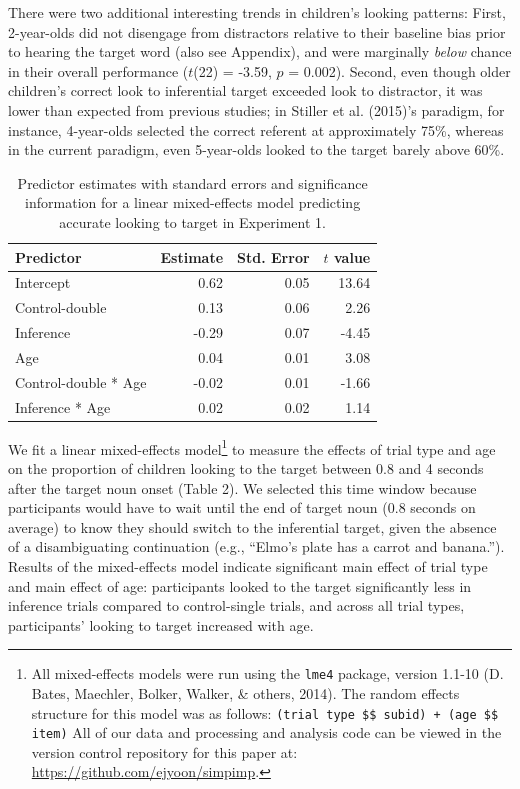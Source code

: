 \documentclass[a4paper,man,apacite,floatsintext]{apa6}
\begin{document}
There were two additional interesting trends in children's looking
patterns: First, 2-year-olds did not disengage from distractors relative
to their baseline bias prior to hearing the target word (also see
Appendix), and were marginally \emph{below} chance in their overall
performance (\(t\)(22) = -3.59, \(p\) = 0.002). Second, even though
older children's correct look to inferential target exceeded look to
distractor, it was lower than expected from previous studies; in Stiller
et al. (2015)'s paradigm, for instance, 4-year-olds selected the correct
referent at approximately 75\%, whereas in the current paradigm, even
5-year-olds looked to the target barely above 60\%.

\begin{table}[tb]
\centering
\begin{tabular}{lrrr}
 Predictor & Estimate & Std. Error & $t$ value \\ 
  \hline
Intercept & 0.62 & 0.05 & 13.64 \\ 
  Control-double & 0.13 & 0.06 & 2.26 \\ 
  Inference & -0.29 & 0.07 & -4.45 \\ 
  Age & 0.04 & 0.01 & 3.08 \\ 
  Control-double * Age & -0.02 & 0.01 & -1.66 \\ 
  Inference * Age & 0.02 & 0.02 & 1.14 \\ 
   \hline
\end{tabular}
\caption{Predictor estimates with standard errors and significance information for a linear mixed-effects model predicting accurate looking to target in Experiment 1.} 
\label{tab:exp1_tab}
\end{table}

We fit a linear mixed-effects model\footnote{All mixed-effects models
  were run using the \texttt{lme4} package, version 1.1-10 (D. Bates,
  Maechler, Bolker, Walker, \& others, 2014). The random effects
  structure for this model was as follows:
  \texttt{(trial type \$\textbar{}\$ subid) + (age \$\textbar{}\$ item)}
  All of our data and processing and analysis code can be viewed in the
  version control repository for this paper at:
  \url{https://github.com/ejyoon/simpimp}.} to measure the effects of
trial type and age on the proportion of children looking to the target
between 0.8 and 4 seconds after the target noun onset (Table 2). We
selected this time window because participants would have to wait until
the end of target noun (0.8 seconds on average) to know they should
switch to the inferential target, given the absence of a disambiguating
continuation (e.g., ``Elmo's plate has a carrot and banana.''). Results
of the mixed-effects model indicate significant main effect of trial
type and main effect of age: participants looked to the target
significantly less in inference trials compared to control-single
trials, and across all trial types, participants' looking to target
increased with age.
\end{document}
